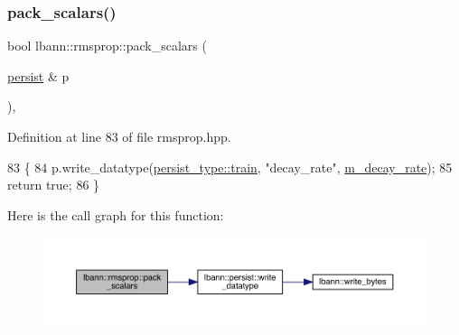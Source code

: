 \mbox{\label{classlbann_1_1rmsprop_ac2c5ae4dc2438da1da54072a297b148b}} 
\subsubsection{\texorpdfstring{pack\+\_\+scalars()}{pack\_scalars()}}
{\footnotesize\ttfamily bool lbann\+::rmsprop\+::pack\+\_\+scalars (\begin{DoxyParamCaption}\item[{\hyperlink{classlbann_1_1persist}{persist} \&}]{p }\end{DoxyParamCaption})\hspace{0.3cm}{\ttfamily [inline]}, {\ttfamily [private]}}



Definition at line 83 of file rmsprop.\+hpp.


\begin{DoxyCode}
83                                 \{
84     p.write\_datatype(\hyperlink{namespacelbann_adee41f31f15f3906cbdcce4a1417eb56a61b3a8faa9c1091806675c230a9abe64}{persist\_type::train}, \textcolor{stringliteral}{"decay\_rate"}, 
      \hyperlink{classlbann_1_1rmsprop_a9cd712c44e7c4995120e2933b0387d71}{m\_decay\_rate});
85     \textcolor{keywordflow}{return} \textcolor{keyword}{true};
86   \}
\end{DoxyCode}
Here is the call graph for this function\+:\nopagebreak
\begin{figure}[H]
\begin{center}
\leavevmode
\includegraphics[width=350pt]{classlbann_1_1rmsprop_ac2c5ae4dc2438da1da54072a297b148b_cgraph}
\end{center}
\end{figure}
\mbox{\label{classlbann_1_1rmsprop_a8abe698168c2d1cb2c65d180552501ef}} 
